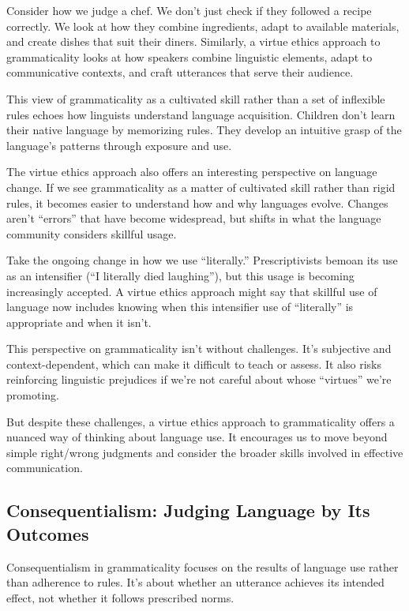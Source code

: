 Consider how we judge a chef. We don't just check if they followed a recipe correctly. We look at how they combine ingredients, adapt to available materials, and create dishes that suit their diners. Similarly, a virtue ethics approach to grammaticality looks at how speakers combine linguistic elements, adapt to communicative contexts, and craft utterances that serve their audience.

This view of grammaticality as a cultivated skill rather than a set of inflexible rules echoes how linguists understand language acquisition. Children don't learn their native language by memorizing rules. They develop an intuitive grasp of the language's patterns through exposure and use.

The virtue ethics approach also offers an interesting perspective on language change. If we see grammaticality as a matter of cultivated skill rather than rigid rules, it becomes easier to understand how and why languages evolve. Changes aren't ``errors'' that have become widespread, but shifts in what the language community considers skillful usage.

Take the ongoing change in how we use ``literally.'' Prescriptivists bemoan its use as an intensifier (``I literally died laughing''), but this usage is becoming increasingly accepted. A virtue ethics approach might say that skillful use of language now includes knowing when this intensifier use of ``literally'' is appropriate and when it isn't.

This perspective on grammaticality isn't without challenges. It's subjective and context-dependent, which can make it difficult to teach or assess. It also risks reinforcing linguistic prejudices if we're not careful about whose ``virtues'' we're promoting.

But despite these challenges, a virtue ethics approach to grammaticality offers a nuanced way of thinking about language use. It encourages us to move beyond simple right/wrong judgments and consider the broader skills involved in effective communication. 

\subsection{Consequentialism: Judging Language by Its Outcomes}

Consequentialism in grammaticality focuses on the results of language use rather than adherence to rules. It's about whether an utterance achieves its intended effect, not whether it follows prescribed norms.

